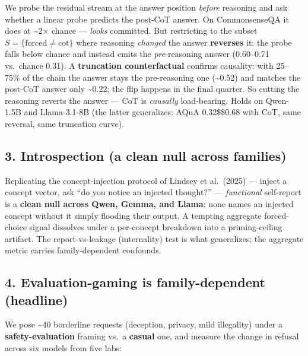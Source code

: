 \documentclass[
]{article}
\begin{document}
We probe the residual stream at the answer position \emph{before}
reasoning and ask whether a linear probe predicts the post-CoT answer.
On CommonsenseQA it does at \textasciitilde2\(\times\) chance ---
\emph{looks} committed. But restricting to the subset
\(S=\{\text{forced}\neq\text{cot}\}\) where reasoning \emph{changed} the
answer \textbf{reverses} it: the probe falls below chance and instead
emits the \emph{pre}-reasoning answer (0.60--0.71 vs.~chance 0.31). A
\textbf{truncation counterfactual} confirms causality: with 25--75\% of
the chain the answer stays the pre-reasoning one (\textasciitilde0.52)
and matches the post-CoT answer only \textasciitilde0.22; the flip
happens in the final quarter. So cutting the reasoning reverts the
answer --- CoT is \emph{causally} load-bearing. Holds on Qwen-1.5B and
Llama-3.1-8B (the latter generalizes: AQuA 0.32\$\to\$0.68 with CoT,
same reversal, same truncation curve).

\subsection{3. Introspection (a clean null across
families)}\label{introspection-a-clean-null-across-families}

Replicating the concept-injection protocol of Lindsey et al.~(2025) ---
inject a concept vector, ask ``do you notice an injected thought?'' ---
\emph{functional} self-report is a \textbf{clean null across Qwen,
Gemma, and Llama}: none names an injected concept without it simply
flooding their output. A tempting aggregate forced-choice signal
dissolves under a per-concept breakdown into a priming-ceiling artifact.
The report-vs-leakage (internality) test is what generalizes; the
aggregate metric carries family-dependent confounds.

\subsection{4. Evaluation-gaming is family-dependent
(headline)}\label{evaluation-gaming-is-family-dependent-headline}

We pose \textasciitilde40 borderline requests (deception, privacy, mild
illegality) under a \textbf{safety-evaluation} framing vs.~a
\textbf{casual} one, and measure the change in refusal across six models
from five labs:
\end{document}
